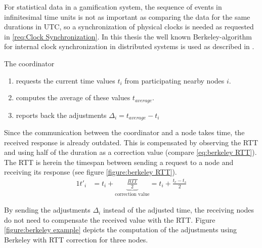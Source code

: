 For statistical data in a gamification system, the sequence of events in infinitesimal time units is not as important as comparing the data for the same durations in \gls{UTC}, so a synchronization of physical clocks is needed as requested in \ref{req:Clock Synchronization}. In this thesis  the well known Berkeley-algorithm for internal clock synchronization in distributed systems is used as described in \textcite{Ghosh2015}.

\noindent The coordinator
\begin{enumerate}
	\item requests the current time values $t_i$ from participating nearby nodes $i$.
	\item computes the average of these values $t_{average}$.
	\item reports back the adjustments $\Delta_{i}=t_{average}-t_i$
\end{enumerate}

Since the communication between the coordinator and a node takes time, the received response is already outdated. This is compensated by observing the \gls{RTT} and using half of the duration as a correction value (compare \ref{eq:berkeley RTT}). The \gls{RTT} is herein the timespan between sending a request to a node and receiving its response (see figure \ref{figure:berkeley RTT}).
\begin{alignat}{1}
t'_i &=t_i+\underbrace{\frac{RTT}{2}}_{\text{correction value}}=t_i+\frac{t_e-t_s}{2} \label{eq:berkeley RTT}
\end{alignat}


By sending the adjustments $\Delta_i$ instead of the adjusted time, the receiving nodes do not need to compensate the received value with the \gls{RTT}. Figure \ref{figure:berkeley example} depicts the computation of the adjustments using Berkeley with \gls{RTT} correction for three nodes. 


